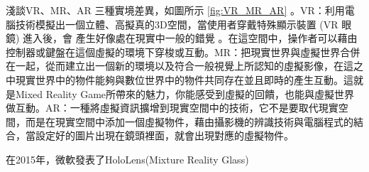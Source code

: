 
淺談VR、MR、AR 三種實境差異，如圖所示 \ref{fig:VR_MR_AR} 。VR：利用電腦技術模擬出一個立體、高擬真的3D空間，當使用者穿戴特殊顯示裝置 (VR 眼鏡) 進入後，會 產生好像處在現實中一般的錯覺 。在這空間中，操作者可以藉由控制器或鍵盤在這個虛擬的環境下穿梭或互動。MR：把現實世界與虛擬世界合併在一起，從而建立出一個新的環境以及符合一般視覺上所認知的虛擬影像，在這之中現實世界中的物件能夠與數位世界中的物件共同存在並且即時的產生互動。這就是Mixed Reality Game所帶來的魅力，你能感受到虛擬的回饋，也能與虛擬世界做互動。AR：一種將虛擬資訊擴增到現實空間中的技術，它不是要取代現實空間，而是在現實空間中添加一個虛擬物件，藉由攝影機的辨識技術與電腦程式的結合，當設定好的圖片出現在鏡頭裡面，就會出現對應的虛擬物件。

在2015年，微軟發表了HoloLens(Mixture Reality Glass)



\EndChapter
